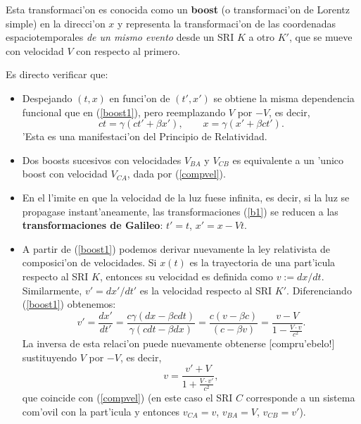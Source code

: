 Esta transformaci'on es conocida como un \textbf{boost} (o transformaci'on de Lorentz simple) en la direcci'on $x$ y representa la transformaci'on de las coordenadas espaciotemporales \textit{de un mismo evento} desde un SRI $K$ a otro $K'$, que se mueve con velocidad $V$ con respecto al primero.

Es directo verificar que:
\begin{itemize}
\item Despejando $(t,x)$ en funci'on de $(t',x')$ se obtiene la misma
dependencia funcional que en (\ref{boost1}), pero reemplazando $V$ por $-V$, es decir,
\begin{equation}
\boxed{ct=\gamma (ct'+\beta x'), \qquad x=\gamma(x'+\beta ct').} \label{boost2}
\end{equation}
'Esta es una manifestaci'on del Principio de Relatividad.

\item Dos boosts sucesivos con velocidades $V_{BA}$ y $V_{CB}$ es
equivalente a un 'unico boost con velocidad $V_{CA}$, dada por (\ref{compvel}).

\item En el l'imite en que la velocidad de la luz fuese infinita, es decir, si la luz se propagase instant'aneamente, las transformaciones (\ref{b1}) se reducen a las \textbf{transformaciones de Galileo}: $t'=t$, $x'=x-Vt$.

\item A partir de (\ref{boost1}) podemos derivar nuevamente la ley relativista de composici'on de velocidades. Si $x(t)$ es la trayectoria de una part'icula respecto al SRI $K$, entonces su velocidad es definida como $v:=dx/dt$. Similarmente, $v'=dx'/dt'$ es la velocidad respecto al SRI $K'$. Diferenciando (\ref{boost1})  obtenemos:
\begin{equation}
 v'=\frac{dx'}{dt'}=\frac{c\gamma(dx-\beta c dt)}{\gamma(cdt-\beta dx)}=\frac{c(v-\beta c)}{(c-\beta v)}=\frac{v-V}{1-\frac{V\cdot v}{c^2}}.
\end{equation}
La inversa de esta relaci'on puede nuevamente obtenerse [compru'ebelo!] sustituyendo $V$ por $-V$, es decir,
\begin{equation}
v=\frac{v'+V}{1+\frac{V\cdot v'}{c^2}},
\end{equation}
que coincide con (\ref{compvel}) (en este caso el SRI $C$ corresponde a un sistema com'ovil con la part'icula y entonces $v_{CA}=v$, $v_{BA}=V$, $v_{CB}=v'$).


\end{itemize}
